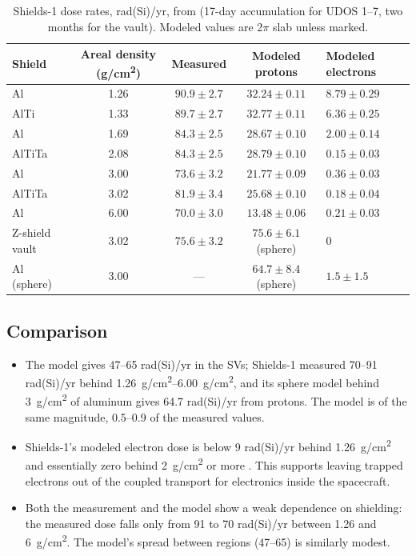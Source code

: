 \begin{table}[h]
\centering
\caption{Shields-1 dose rates, rad(Si)/yr, from \citet{thomsen2022shields} (17-day accumulation for UDOS 1--7, two months for the vault). Modeled values are 2$\pi$ slab unless marked.}
\label{tab:shields}
\begin{tabular}{lcccl}
\toprule
Shield & Areal density (\si{g/cm^2}) & Measured & Modeled protons & Modeled electrons \\
\midrule
Al     & 1.26 & $90.9\pm2.7$ & $32.24\pm0.11$ & $8.79\pm0.29$ \\
AlTi   & 1.33 & $89.7\pm2.7$ & $32.77\pm0.11$ & $6.36\pm0.25$ \\
Al     & 1.69 & $84.3\pm2.5$ & $28.67\pm0.10$ & $2.00\pm0.14$ \\
AlTiTa & 2.08 & $84.3\pm2.5$ & $28.79\pm0.10$ & $0.15\pm0.03$ \\
Al     & 3.00 & $73.6\pm3.2$ & $21.77\pm0.09$ & $0.36\pm0.03$ \\
AlTiTa & 3.02 & $81.9\pm3.4$ & $25.68\pm0.10$ & $0.18\pm0.04$ \\
Al     & 6.00 & $70.0\pm3.0$ & $13.48\pm0.06$ & $0.21\pm0.03$ \\
Z-shield vault & 3.02 & $75.6\pm3.2$ & $75.6\pm6.1$ (sphere) & 0 \\
Al (sphere) & 3.00 & --- & $64.7\pm8.4$ (sphere) & $1.5\pm1.5$ \\
\bottomrule
\end{tabular}
\end{table}

\subsection{Comparison}
\begin{itemize}
  \item The model gives 47--65 rad(Si)/yr in the SVs; Shields-1 measured 70--91 rad(Si)/yr behind \SIrange{1.26}{6.00}{g/cm^2}, and its sphere model behind \SI{3}{g/cm^2} of aluminum gives 64.7 rad(Si)/yr from protons. The model is of the same magnitude, 0.5--0.9 of the measured values.
  \item Shields-1's modeled electron dose is below 9 rad(Si)/yr behind \SI{1.26}{g/cm^2} and essentially zero behind \SI{2}{g/cm^2} or more \citep{thomsen2022shields}. This supports leaving trapped electrons out of the coupled transport for electronics inside the spacecraft.
  \item Both the measurement and the model show a weak dependence on shielding: the measured dose falls only from 91 to 70 rad(Si)/yr between \num{1.26} and \SI{6}{g/cm^2}. The model's spread between regions (47--65) is similarly modest.
\end{itemize}

